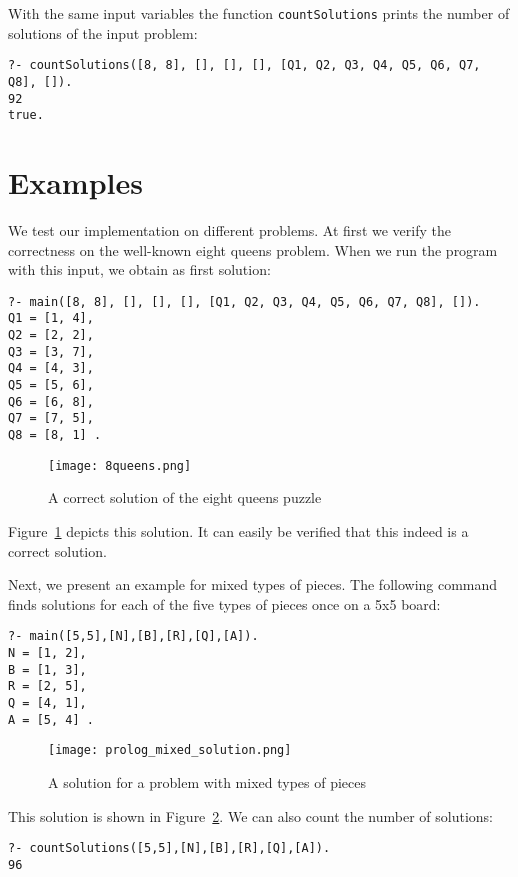 \documentclass{article}
\begin{document}
With the same input variables the function \verb|countSolutions| prints the number of solutions of the input problem:
\begin{verbatim}
?- countSolutions([8, 8], [], [], [], [Q1, Q2, Q3, Q4, Q5, Q6, Q7, Q8], []).
92
true.
\end{verbatim}

\section{Examples} \label{sec:examples}

We test our implementation on different problems. At first we verify the correctness on the well-known eight queens problem. When we run the program with this input, we obtain as first solution:
\begin{verbatim}
?- main([8, 8], [], [], [], [Q1, Q2, Q3, Q4, Q5, Q6, Q7, Q8], []).
Q1 = [1, 4],
Q2 = [2, 2],
Q3 = [3, 7],
Q4 = [4, 3],
Q5 = [5, 6],
Q6 = [6, 8],
Q7 = [7, 5],
Q8 = [8, 1] .
\end{verbatim}

\begin{figure}[h]
\centering
\texttt{[image: 8queens.png]}
\caption{A correct solution of the eight queens puzzle}
\label{fig:8_queens}
\end{figure}

Figure~\ref{fig:8_queens} depicts this solution. It can easily be verified that this indeed is a correct solution.

Next, we present an example for mixed types of pieces. The following command finds solutions for each of the five types of pieces once on a 5x5 board:
\begin{verbatim}
?- main([5,5],[N],[B],[R],[Q],[A]).
N = [1, 2],
B = [1, 3],
R = [2, 5],
Q = [4, 1],
A = [5, 4] .
\end{verbatim}

\begin{figure}[h]
\centering
\texttt{[image: prolog\_mixed\_solution.png]}
\caption{A solution for a problem with mixed types of pieces}
\label{fig:mixed_solution}
\end{figure}

This solution is shown in Figure~\ref{fig:mixed_solution}. We can also count the number of solutions:
\begin{verbatim}
?- countSolutions([5,5],[N],[B],[R],[Q],[A]).
96
\end{verbatim}
\end{document}
